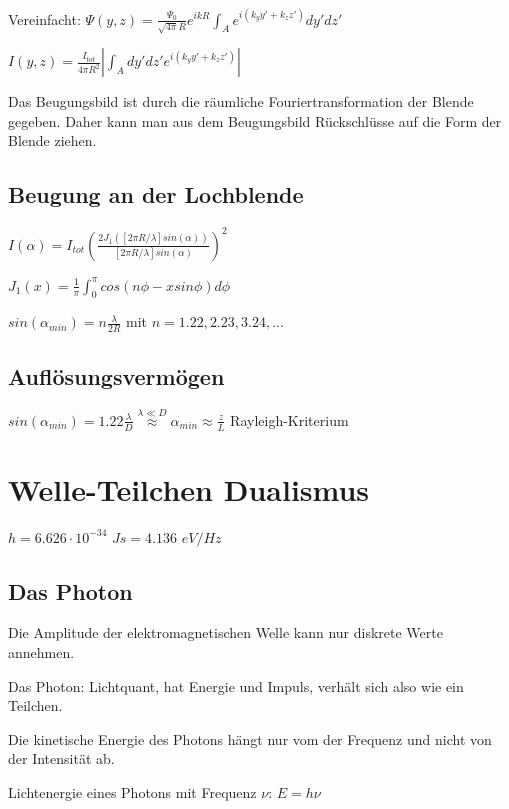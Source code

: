 \documentclass[10pt,a4paper]{scrartcl}
\begin{document}
\begin{multicols*}{3}
	Vereinfacht: $\Psi(y,z)=\frac{\Psi_0}{\sqrt{4\pi}R}e^{ikR}\int_A{e^{i(k_yy'+k_zz')}dy'dz'}$
	
	
	$I(y,z) = \frac{I_{tot}}{4\pi R^2}|\int_A{dy'dz'e^{i(k_yy'+k_zz')}}|$
	
	\dahe Das Beugungsbild ist durch die räumliche Fouriertransformation der Blende gegeben. Daher kann man aus dem Beugungsbild Rückschlüsse auf die Form der Blende ziehen.	
	
	\subsection{Beugung an der Lochblende}
	
	$I(\alpha)=I_{tot}(\frac{2J_1([2\pi R/\lambda]sin(\alpha))}{[2\pi R/\lambda]sin(\alpha)})^2$ 
	
	
	$J_1(x)=\frac{1}{\pi}\int_0^\pi{cos(n\phi-xsin\phi)d\phi}$
	
	$sin(\alpha_{min})=n\frac{\lambda}{2R}$ \hfill mit $n=1.22,2.23,3.24,...$
	
	\subsection{Auflösungsvermögen}
	
	$sin(\alpha_{min})=1.22\frac{\lambda}{D}\overset{\lambda\ll D}{\approx}\alpha_{min}\approx \frac{z}{L}$ \hfill Rayleigh-Kriterium
	
	\section{Welle-Teilchen Dualismus}
	
	$h = 6.626\cdot 10^{-34}$ $Js=4.136$ $eV/Hz$
		
	\subsection{Das Photon}

	Die Amplitude der elektromagnetischen Welle kann nur diskrete Werte annehmen.

	Das Photon: Lichtquant, hat Energie und Impuls, verhält sich also wie ein Teilchen.
	
	Die kinetische Energie des Photons hängt nur vom der Frequenz und nicht von der Intensität ab.

	Lichtenergie eines Photons mit Frequenz $\nu$: $E = h\nu$
	

\end{multicols*}
\end{document}
